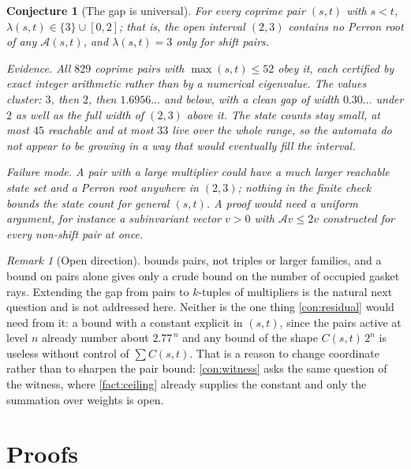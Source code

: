 \documentclass[11pt]{amsart}
\newtheorem{conjecture}[theorem]{Conjecture}
\theoremstyle{definition}
\theoremstyle{remark}
\newtheorem{remark}[theorem]{Remark}
\begin{document}
\begin{conjecture}[The gap is universal]
\label{con:gap}
For every coprime pair $(s,t)$ with $s<t$, $\lambda(s,t)\in\{3\}\cup[0,2]$; that is, the open interval $(2,3)$ contains no Perron root of any $\mathcal{A}(s,t)$, and $\lambda(s,t)=3$ only for shift pairs.
\smallskip

\noindent\emph{Evidence.} All $829$ coprime pairs with $\max(s,t)\le 52$ obey it, each certified by exact integer arithmetic rather than by a numerical eigenvalue. The values cluster: $3$, then $2$, then $1.6956\ldots$ and below, with a clean gap of width $0.30\ldots$ under $2$ as well as the full width of $(2,3)$ above it. The state counts stay small, at most $45$ reachable and at most $33$ live over the whole range, so the automata do not appear to be growing in a way that would eventually fill the interval.
\smallskip

\noindent\emph{Failure mode.} A pair with a large multiplier could have a much larger reachable state set and a Perron root anywhere in $(2,3)$; nothing in the finite check bounds the state count for general $(s,t)$. A proof would need a uniform argument, for instance a subinvariant vector $v>0$ with $\mathcal{A}v\le 2v$ constructed for every non-shift pair at once.
\end{conjecture}

\begin{remark}[Open direction]
\label{rem:open}
 bounds pairs, not triples or larger families, and a bound on pairs alone gives only a crude bound on the number of occupied gasket rays. Extending the gap from pairs to $k$-tuples of multipliers is the natural next question and is not addressed here. Neither is the one thing \cref{con:residual} would need from it: a bound with a constant explicit in $(s,t)$, since the pairs active at level $n$ already number about $2.77^{\,n}$ and any bound of the shape $C(s,t)\,2^n$ is useless without control of $\sum C(s,t)$. That is a reason to change coordinate rather than to sharpen the pair bound: \cref{con:witness} asks the same question of the witness, where \cref{fact:ceiling} already supplies the constant and only the summation over weights is open.
\end{remark}

\section{Proofs}
\label{sec:proofs}
\end{document}
